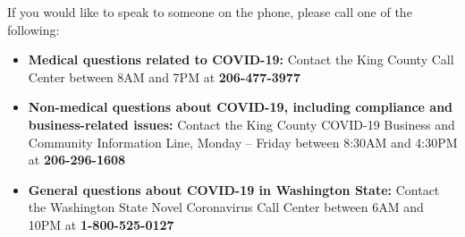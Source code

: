 \documentclass[10pt]{article}
\begin{document}
If you would like to speak to someone on the phone, please call one of the
following:

\begin{itemize}

\item

  \textbf{Medical questions related to COVID-19:} Contact the King County Call
  Center between 8AM and 7PM at \textbf{206-477-3977}

\item

  \textbf{Non-medical questions about COVID-19, including compliance and
  business-related issues:} Contact the King County COVID-19 Business and
  Community Information Line, Monday – Friday between 8:30AM and 4:30PM at
  \textbf{206-296-1608}

\item

  \textbf{General questions about COVID-19 in Washington State:} Contact the
  Washington State Novel Coronavirus Call Center between 6AM and 10PM at
  \textbf{1-800-525-0127}

\end{itemize}
\end{document}

